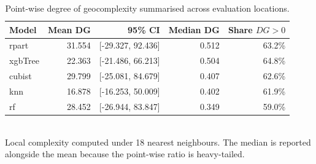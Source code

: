 \begin{table}[htbp]
\centering
\caption{Point-wise degree of geocomplexity summarised across evaluation locations.}
\label{tab:dg}
\begin{tabular}{lrrrr}
\hline
\textbf{Model} & \textbf{Mean DG} & \textbf{95\% CI} & \textbf{Median DG} & \textbf{Share $DG>0$} \\
\hline
rpart & 31.554 & [-29.327, 92.436] & 0.512 & 63.2\% \\
xgbTree & 22.363 & [-21.486, 66.213] & 0.504 & 64.8\% \\
cubist & 29.799 & [-25.081, 84.679] & 0.407 & 62.6\% \\
knn & 16.878 & [-16.253, 50.009] & 0.402 & 61.9\% \\
rf & 28.452 & [-26.944, 83.847] & 0.349 & 59.0\% \\
\hline
\end{tabular}
\\[2pt]\footnotesize Local complexity computed under 18 nearest neighbours. The median is reported alongside the mean because the point-wise ratio is heavy-tailed.
\end{table}

